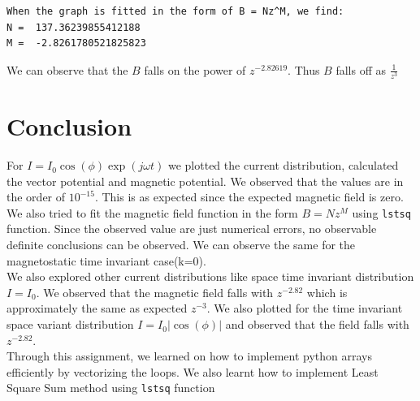 \documentclass[12pt, a4paper]{report}
\begin{document}
\begin{verbatim}
When the graph is fitted in the form of B = Nz^M, we find:
N =  137.36239855412188
M =  -2.8261780521825823
\end{verbatim}
We can observe that the $B$ falls on the power of $z^{-2.82619}$. Thus $B$ falls off as $\frac{1}{z^3}$

\section*{Conclusion}
For $I = I_0\cos({\phi})\exp({j\omega t})$ we plotted the current distribution, calculated the vector potential and magnetic potential. We observed that the values are in the order of $10^{-15}$. This is as expected since the expected magnetic field is zero. 
\\

We also tried to fit the magnetic field function in the form $B = Nz^M$ using \texttt{lstsq} function. Since the observed value are just numerical errors, no observable definite conclusions can be observed. We can observe the same for the magnetostatic time invariant case(k=0). 
\\

We also explored other current distributions like space time invariant distribution $I = I_0$. We observed that the magnetic field falls with $z^{-2.82}$ which is approximately the same as expected $z^{-3}$. We also plotted for the time invariant space variant distribution $I = I_0|\cos({\phi})|$ and observed that the field falls with $z^{-2.82}$. 
\\

Through this assignment, we learned on how to implement python arrays efficiently by vectorizing the loops. We also learnt how to implement Least Square Sum method using \texttt{lstsq} function
\clearpage
\end{document}

